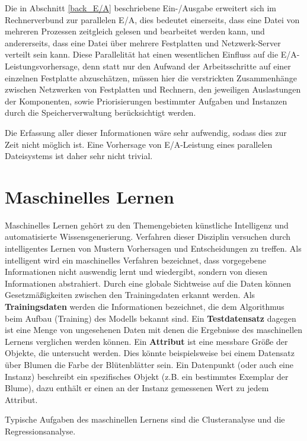 \documentclass[
	12pt,
	a4paper,
	BCOR10mm,
	DIV14,
	listof=totoc,
	bibliography=totoc,
	headsepline
]{scrreprt}
\begin{document}
Die in Abschnitt \ref{back_E/A} beschriebene Ein-/Ausgabe erweitert sich im Rechnerverbund zur parallelen E/A, dies bedeutet einerseits, dass eine Datei von mehreren Prozessen zeitgleich gelesen und bearbeitet werden kann, und andererseits, dass eine Datei über mehrere Festplatten und Netzwerk-Server verteilt sein kann. Diese Parallelität hat einen wesentlichen Einfluss auf die E/A-Leistungsvorhersage, denn statt nur den Aufwand der Arbeitsschritte auf einer einzelnen Festplatte abzuschätzen, müssen hier die verstrickten Zusammenhänge zwischen Netzwerken von Festplatten und Rechnern, den jeweiligen Auslastungen der Komponenten, sowie Priorisierungen bestimmter Aufgaben und Instanzen durch die Speicherverwaltung berücksichtigt werden.

Die Erfassung aller dieser Informationen wäre sehr aufwendig, sodass dies zur Zeit nicht möglich ist. Eine Vorhersage von E/A-Leistung eines parallelen Dateisystems ist daher sehr nicht trivial.

\section{Maschinelles Lernen}
\label{back_ML}
Maschinelles Lernen gehört zu den Themengebieten künstliche Intelligenz und automatisierte Wissensgenerierung. Verfahren dieser Disziplin versuchen durch intelligentes Lernen von Mustern Vorhersagen und Entscheidungen zu treffen.
Als intelligent wird ein maschinelles Verfahren bezeichnet, dass vorgegebene Informationen nicht auswendig lernt und wiedergibt, sondern von diesen Informationen abstrahiert.
Durch eine globale Sichtweise auf die Daten können Gesetzmäßigkeiten zwischen den Trainingsdaten erkannt werden.
Als \textbf{Trainingsdaten} werden die Informationen bezeichnet, die dem Algorithmus beim Aufbau (Training) des Modells bekannt sind.
Ein \textbf{Testdatensatz} dagegen ist eine Menge von ungesehenen Daten mit denen die Ergebnisse des maschinellen Lernens verglichen werden können.
Ein \textbf{Attribut} ist eine messbare Größe der Objekte, die untersucht werden. Dies könnte beispielsweise bei einem Datensatz über Blumen die Farbe der Blütenblätter sein.
Ein Datenpunkt (oder auch eine Instanz) beschreibt ein spezifisches Objekt (z.B. ein bestimmtes Exemplar der Blume), dazu enthält er einen an der Instanz gemessenen Wert zu jedem Attribut.

Typische Aufgaben des maschinellen Lernens sind die Clusteranalyse und die Regressionsanalyse.
\end{document}

